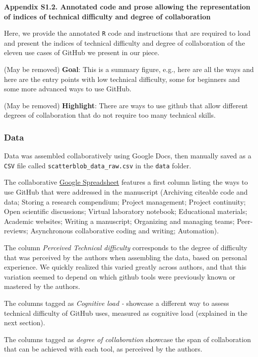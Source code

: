 \documentclass[
  11pt,
]{article}
\begin{document}
\noindent
\textbf{Appendix S1.2. Annotated code and prose allowing the representation of indices of technical difficulty and degree of collaboration}

Here, we provide the annotated \texttt{R} code and instructions that are required to load and present the indices of technical difficulty and degree of collaboration of the eleven use cases of GitHub we present in our piece.

(May be removed) \textbf{Goal}: This is a summary figure, e.g., here are all the ways and here are the entry points with low technical difficulty, some for beginners and some more advanced ways to use GitHub.

(May be removed) \textbf{Highlight}: There are ways to use github that allow different degrees of collaboration that do not require too many technical skills.

\hypertarget{data}{%
\subsubsection{Data}\label{data}}

Data was assembled collaboratively using Google Docs, then manually saved as a \texttt{CSV} file called \texttt{scatterblob\_data\_raw.csv} in the \texttt{data} folder.

The collaborative \href{https://docs.google.com/spreadsheets/d/1zCRgctjfjE2xZN9MkqfFh222K6bvVvA3gT0UdkL_CS8/edit\#gid=0}{Google Spreadsheet} features a first column listing the ways to use GitHub that were addressed in the manuscript (Archiving citeable code and data; Storing a research compendium; Project management; Project continuity; Open scientific discussions; Virtual laboratory notebook; Educational materials; Academic websites; Writing a manuscript; Organizing and managing teams; Peer-reviews; Asynchronous collaborative coding and writing; Automation).

The column \emph{Perceived Technical difficulty} corresponds to the degree of difficulty that was perceived by the authors when assembling the data, based on personal experience.
We quickly realized this varied greatly across authors, and that this variation seemed to depend on which github tools were previously known or mastered by the authors.

The columns tagged as \emph{Cognitive load -} showcase a different way to assess technical difficulty of GitHub uses, measured as cognitive load (explained in the next section).

The columns tagged as \emph{degree of collaboration} showcase the span of collaboration that can be achieved with each tool, as perceived by the authors.
\end{document}
